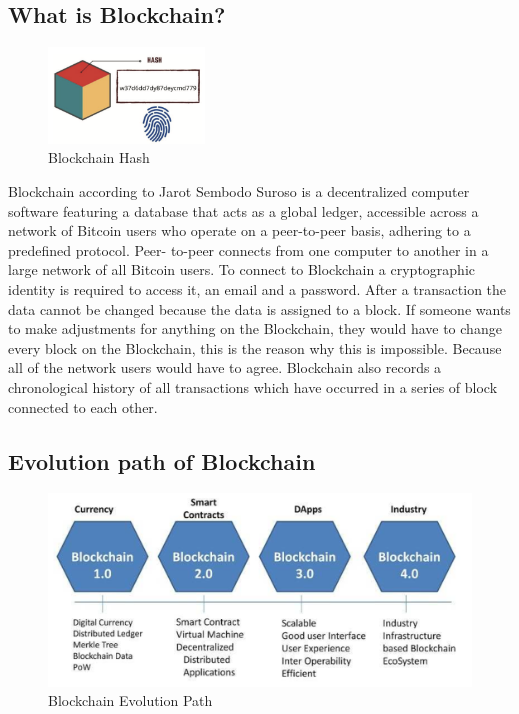 \documentclass[10pt,english,a4paper]{article}
\begin{document}
\subsection{What is Blockchain?}
\begin{figure}
  \centering
  \includegraphics[width=0.37\textwidth]{Blockchain-hash.png} 
  \caption{Blockchain Hash\cite{Jain:Criminal:record}}
\end{figure} 
Blockchain according to Jarot Sembodo Suroso\cite{Suroso:SKCK} is a decentralized computer software featuring a database that acts as a global ledger, accessible across a network of Bitcoin users who operate on a peer-to-peer basis, adhering to a predefined protocol. Peer- to-peer connects from one computer to another in a large network of all Bitcoin users. To connect to Blockchain a cryptographic identity is required to access it, an email and a password. After a transaction the data cannot be changed because the data is assigned to a block. If someone wants to make adjustments for anything on the Blockchain, they would have to change every block on the Blockchain, this is  the reason why this is impossible. Because all of the network users would have to agree. Blockchain also records a chronological history of all transactions which have occurred in a series of block connected to each other.\cite{Suroso:SKCK}

\subsection{Evolution path of Blockchain}\label{evolution}
\begin{figure}[h]
    \centering
    \includegraphics[scale=0.4]{Blockchain-evolution.png}
    \caption{Blockchain Evolution Path \cite{Suroso:SKCK}}
    \label{histogram}
\end{figure}
\end{document}
